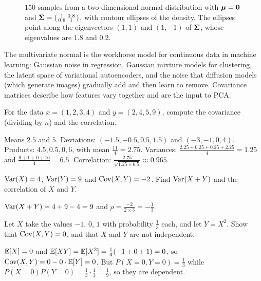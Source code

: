 \begin{figure}[htbp]
\caption{$150$ samples from a two-dimensional normal distribution with
  $\bm{\mu} = \bm{0}$ and $\bm{\Sigma} = \left(\begin{smallmatrix} 1 & 0.8\\ 0.8 &
  1\end{smallmatrix}\right)$, with contour ellipses of the density. The ellipses
  point along the eigenvectors $(1, 1)$ and $(1, -1)$ of $\bm{\Sigma}$, whose eigenvalues
  are $1.8$ and $0.2$.}
\label{fig:gaussian-2d}
\end{figure}

\begin{mlnote}
The multivariate normal is the workhorse model for continuous data in machine
learning: Gaussian noise in regression, Gaussian mixture models for clustering,
the latent space of variational autoencoders, and the noise that diffusion
models (which generate images) gradually add and then learn to remove.
Covariance matrices describe how features vary together and are the input to
PCA.
\end{mlnote}

\sectionexercises

\begin{exercise}
For the data $x = (1, 2, 3, 4)$ and $y = (2, 4, 5, 9)$, compute the covariance
(dividing by $n$) and the correlation.
\end{exercise}
\begin{solution}
Means $2.5$ and $5$. Deviations: $(-1.5, -0.5, 0.5, 1.5)$ and $(-3, -1, 0, 4)$.
Products: $4.5, 0.5, 0, 6$, with mean $\tfrac{11}{4} = 2.75$. Variances:
$\tfrac{2.25 + 0.25 + 0.25 + 2.25}{4} = 1.25$ and $\tfrac{9 + 1 + 0 + 16}{4} = 6.5$.
Correlation: $\tfrac{2.75}{\sqrt{1.25\times6.5}} \approx 0.965$.
\end{solution}

\begin{exercise}
$\operatorname{Var}(X) = 4$, $\operatorname{Var}(Y) = 9$ and $\operatorname{Cov}(X, Y) = -2$. Find $\operatorname{Var}(X + Y)$ and the
correlation of $X$ and $Y$.
\end{exercise}
\begin{solution}
$\operatorname{Var}(X + Y) = 4 + 9 - 4 = 9$ and $\rho = \tfrac{-2}{2\times3} = -\tfrac13$.
\end{solution}

\begin{exercise}
Let $X$ take the values $-1$, $0$, $1$ with probability $\tfrac13$ each, and let
$Y = X^2$. Show that $\operatorname{Cov}(X, Y) = 0$, and that $X$ and $Y$ are not independent.
\end{exercise}
\begin{solution}
$\mathbb{E}[X] = 0$ and $\mathbb{E}[XY] = \mathbb{E}[X^3] = \tfrac13(-1 + 0 + 1) = 0$, so
$\operatorname{Cov}(X, Y) = 0 - 0\cdot\mathbb{E}[Y] = 0$. But $P(X = 0, Y = 0) = \tfrac13$ while
$P(X = 0)P(Y = 0) = \tfrac13\cdot\tfrac13 = \tfrac19$, so they are dependent.
\end{solution}

